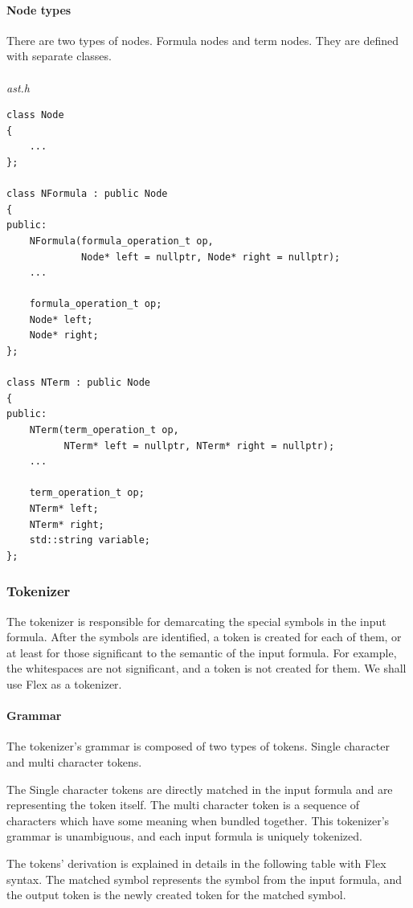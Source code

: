 \documentclass{article}
\begin{document}
	\newpage
	\paragraph{Node types} There are two types of nodes. Formula nodes and term nodes. They are defined with separate classes.
	\\
	\\
\noindent
\textit{ast.h}
	\begin{lstlisting}
class Node
{
    ...
};

class NFormula : public Node
{
public:
    NFormula(formula_operation_t op,
             Node* left = nullptr, Node* right = nullptr);
    ...

    formula_operation_t op;
    Node* left;
    Node* right;
};

class NTerm : public Node
{
public:
    NTerm(term_operation_t op,
          NTerm* left = nullptr, NTerm* right = nullptr);
    ...

    term_operation_t op;
    NTerm* left;
    NTerm* right;
    std::string variable;
};
	\end{lstlisting}

	\subsubsection{Tokenizer}
	The tokenizer is responsible for demarcating the special symbols in the input formula.
	After the symbols are identified, a token is created for each of them, or at least for those significant to the semantic of the input formula.
	For example, the whitespaces are not significant, and a token is not created for them.
	We shall use Flex as a tokenizer.

	\paragraph{Grammar} The tokenizer's grammar is composed of two types of tokens. Single character and multi character tokens.

	The Single character tokens are directly matched in the input formula and are representing the token itself.
	The multi character token is a sequence of characters which have some meaning when bundled together.
	This tokenizer's grammar is unambiguous, and each input formula is uniquely tokenized.

	The tokens' derivation is explained in details in the following table with Flex syntax. The matched symbol represents the symbol from the input formula, and the output token is the newly created token for the matched symbol.
\end{document}
